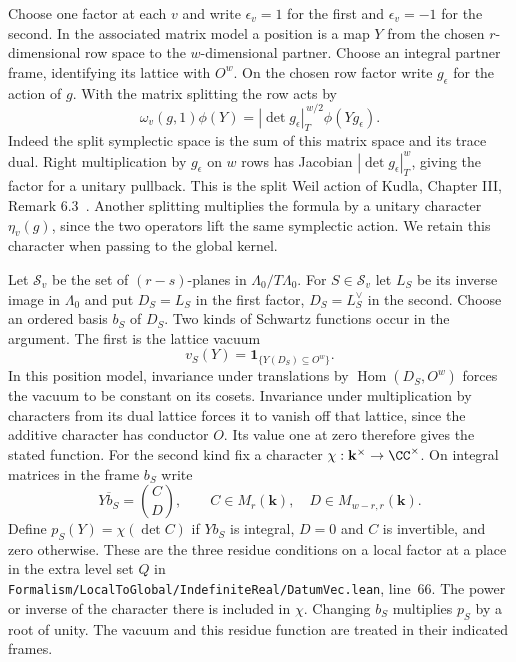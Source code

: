 \documentclass[a4paper,11pt]{article}
\theoremstyle{definition}
\theoremstyle{remark}
\newcommand{\srcloc}[2]{{\small\nolinkurl{#1.lean}}, line~#2}
\numberwithin{equation}{section}
\begin{document}
Choose one factor at each \(v\) and write \(\epsilon_v=1\) for
the first and \(\epsilon_v=-1\) for the second. In the associated
matrix model a position is a map \(Y\) from the chosen
\(r\)-dimensional row space to the \(w\)-dimensional partner.
Choose an integral partner frame, identifying its lattice with
\(O^w\). On the chosen row factor write \(g_\epsilon\) for the
action of \(g\). With the matrix splitting the row acts by
\begin{equation}
   \omega_v(g,1)\phi(Y)
       =|\det g_\epsilon|_T^{\,w/2}\phi(Yg_\epsilon).
   \label{eq:weil161}
\end{equation}
Indeed the split symplectic space is the sum of this matrix
space and its trace dual. Right multiplication by \(g_\epsilon\)
on \(w\) rows has Jacobian \(|\det g_\epsilon|_T^w\), giving the
factor for a unitary pullback. This is the split Weil action of
Kudla, Chapter III, Remark 6.3~\cite{XVIII-XIII-IV-kudla29}. Another splitting
multiplies the formula by a unitary character \(\eta_v(g)\),
since the two operators lift the same symplectic action. We
retain this character when passing to the global kernel.

Let \(\mathcal S_v\) be the set of \((r-s)\)-planes in
\(\Lambda_0/T\Lambda_0\). For \(S\in\mathcal S_v\) let
\(L_S\) be its inverse image in \(\Lambda_0\) and put
\(D_S=L_S\) in the first factor, \(D_S=L_S^\vee\) in the second.
Choose an ordered basis \(b_S\) of \(D_S\). Two kinds of
Schwartz functions occur in the argument. The first is the
lattice vacuum
\[
    v_S(Y)=\mathbf1_{\{Y(D_S)\subseteq O^w\}}.
\]
In this position model, invariance under translations by
\(\operatorname{Hom}(D_S,O^w)\) forces the vacuum to be constant
on its cosets. Invariance under multiplication by characters
from its dual lattice forces it to vanish off that lattice,
since the additive character has conductor \(O\). Its value
one at zero therefore gives the stated function. For the second
kind fix a character \(\chi:\mathbf k^\times\to\CC^\times\).
On integral matrices in the frame \(b_S\) write
\[
     \overline{Yb_S}=\binom{C}{D},\qquad
        C\in M_r(\mathbf k),\quad D\in M_{w-r,r}(\mathbf k).
\]
Define \(p_S(Y)=\chi(\det C)\) if \(Yb_S\) is integral,
\(D=0\) and \(C\) is invertible, and zero otherwise. These
are the three residue conditions on a local factor at a
place in the extra level set \(Q\) in
\srcloc{Formalism/LocalToGlobal/IndefiniteReal/DatumVec}{66}.
The power or inverse of the character there is included in
\(\chi\). Changing \(b_S\) multiplies \(p_S\) by a root of
unity. The vacuum and this residue function are treated in
their indicated frames.
\end{document}
